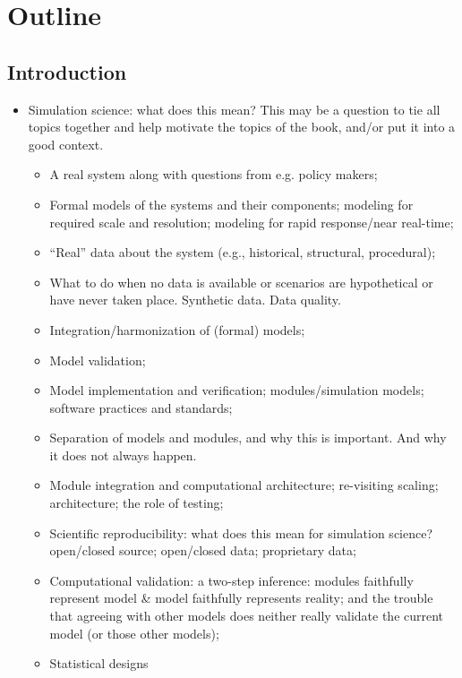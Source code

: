 \documentclass[12pt]{book}
\begin{document}
\chapter{Outline}

\section{Introduction}

\begin{itemize}
\item Simulation science: what does this mean? This may be a question
  to tie all topics together and help motivate the topics of the book,
  and/or put it into a good context.
  \begin{itemize}
  \item A real system along with questions from e.g. policy makers;
  \item Formal models of the systems and their components; modeling for
    required scale and resolution; modeling for rapid response/near real-time;
  \item ``Real'' data about the system (e.g., historical, structural,
    procedural);
  \item What to do when no data is available or scenarios are
    hypothetical or have never taken place. Synthetic data. Data quality.
  \item Integration/harmonization of (formal) models;
  \item Model validation;
  \item Model implementation and verification; modules/simulation
    models; software practices and standards;
  \item Separation of models and modules, and why this is
    important. And why it does not always happen.
  \item Module integration and computational architecture; re-visiting
    scaling; architecture; the role of testing;
  \item Scientific reproducibility: what does this mean for simulation
    science? open/closed source; open/closed data; proprietary data;
  \item Computational validation: a two-step inference: modules
    faithfully represent model \& model faithfully represents reality;
    and the trouble that agreeing with other models does neither
    really validate the current model (or those other models);
  \item Statistical designs

\end{itemize}
\end{itemize}
\end{document}

